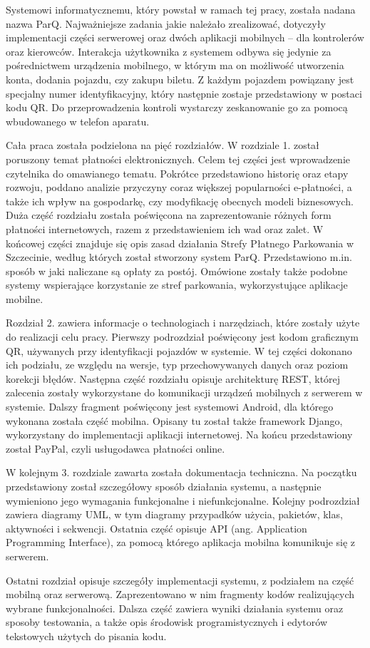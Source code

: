 Systemowi informatycznemu, który powstał w ramach tej pracy, została nadana 
nazwa ParQ. Najważniejsze zadania jakie należało zrealizować, 
dotyczyły implementacji części serwerowej oraz dwóch aplikacji mobilnych -- dla 
kontrolerów oraz kierowców. Interakcja użytkownika z systemem odbywa się 
jedynie za pośrednictwem urządzenia mobilnego, w którym ma on możliwość 
utworzenia konta, dodania pojazdu, czy zakupu biletu. Z każdym pojazdem 
powiązany jest specjalny numer identyfikacyjny, który następnie zostaje 
przedstawiony w postaci kodu QR. Do przeprowadzenia kontroli wystarczy 
zeskanowanie go za pomocą wbudowanego w telefon aparatu.

Cała praca została podzielona na pięć rozdziałów. W rozdziale 1. został 
poruszony temat płatności elektronicznych. Celem tej części jest wprowadzenie 
czytelnika do omawianego tematu. Pokrótce przedstawiono historię oraz etapy 
rozwoju, poddano analizie przyczyny coraz większej popularności e-płatności, a 
także ich wpływ na gospodarkę, czy modyfikację obecnych modeli biznesowych. 
Duża część rozdziału została poświęcona na zaprezentowanie różnych form 
płatności internetowych, razem z przedstawieniem ich wad oraz zalet. W końcowej 
części znajduje się opis zasad działania Strefy Płatnego Parkowania w 
Szczecinie, według których został stworzony system ParQ. Przedstawiono m.in. 
sposób w jaki naliczane są opłaty za postój. Omówione zostały także podobne 
systemy wspierające korzystanie ze stref parkowania, wykorzystujące aplikacje 
mobilne.

Rozdział 2. zawiera informacje o technologiach i narzędziach, które zostały 
użyte do realizacji celu pracy. Pierwszy podrozdział poświęcony jest kodom 
graficznym QR, używanych przy identyfikacji pojazdów w systemie. W tej części 
dokonano ich podziału, ze względu na wersje, typ przechowywanych danych oraz 
poziom korekcji błędów. Następna część rozdziału opisuje architekturę REST, 
której zalecenia zostały wykorzystane do komunikacji urządzeń mobilnych z 
serwerem w systemie. Dalszy fragment poświęcony jest systemowi Android, dla 
którego wykonana została część mobilna. Opisany tu został także  
framework Django, wykorzystany do implementacji aplikacji internetowej. Na końcu przedstawiony został PayPal, czyli usługodawca płatności online. 

W kolejnym 3. rozdziale zawarta została dokumentacja techniczna. Na początku przedstawiony został szczegółowy sposób działania systemu, a następnie wymieniono jego wymagania funkcjonalne i niefunkcjonalne. Kolejny podrozdział zawiera diagramy UML, w tym diagramy przypadków użycia, pakietów, klas, aktywności i sekwencji. Ostatnia część opisuje API (ang. Application Programming Interface), za pomocą którego aplikacja mobilna komunikuje się 
z serwerem.

Ostatni rozdział opisuje szczegóły implementacji systemu, z podziałem na część mobilną oraz serwerową. Zaprezentowano w nim fragmenty kodów realizujących wybrane funkcjonalności. Dalsza część zawiera wyniki działania systemu oraz sposoby testowania, a także opis środowisk programistycznych i edytorów tekstowych użytych do pisania kodu.
